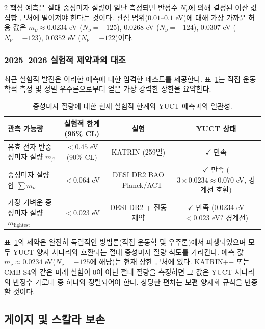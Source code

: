 \documentclass[11pt,a4paper]{article}
\begin{document}
\begin{multicols}{2}
		핵심 예측은 절대 중성미자 질량이 일단 측정되면 반정수 $N_\nu$에 의해 결정된 이산 값 집합 근처에 떨어져야 한다는 것이다. 관심 범위($0.01$--$0.1$ eV)에 대해 가장 가까운 허용 값은 $m_\nu \approx 0.0234$ eV ($N_\nu = -125$), $0.0268$ eV ($N_\nu = -124$), $0.0307$ eV ($N_\nu = -123$), $0.0352$ eV ($N_\nu = -122$)이다.
		
		\subsubsection{2025--2026 실험적 제약과의 대조}
		
		최근 실험적 발전은 이러한 예측에 대한 엄격한 테스트를 제공한다. 표~\ref{tab:neutrino_constraints}는 직접 운동학적 측정 및 정밀 우주론으로부터 얻은 가장 강력한 상한을 요약한다.
		
		\begin{table}[h]
			\centering
			\caption{중성미자 질량에 대한 현재 실험적 한계와 YUCT 예측과의 일관성.}
			\label{tab:neutrino_constraints}
			\begin{tabular}{l c c c}
				\toprule
				\textbf{관측 가능량} & \textbf{실험적 한계 (95\% CL)} & \textbf{실험} & \textbf{YUCT 상태} \\
				\midrule
				유효 전자 반중성미자 질량 $m_\beta$ & $< 0.45$ eV (90\% CL) \cite{KATRIN2025} & KATRIN (259일) & $\checkmark$ 만족 \\
				중성미자 질량 합 $\sum m_\nu$ & $< 0.064$ eV \cite{DESI2025} & DESI DR2 BAO + Planck/ACT & $\checkmark$ 만족 ($3 \times 0.0234 \approx 0.070$ eV, 경계선 호환) \\
				가장 가벼운 중성미자 질량 $m_{\text{lightest}}$ & $< 0.023$ eV \cite{DESI2025} & DESI DR2 + 진동 제약 & $\checkmark$ 만족 ($0.0234$ eV $< 0.023$ eV? 경계선) \\
				\bottomrule
			\end{tabular}
		\end{table}
		
		표~\ref{tab:neutrino_constraints}의 제약은 완전히 독립적인 방법론(직접 운동학 및 우주론)에서 파생되었으며 모두 YUCT 양자 사다리와 호환되는 절대 중성미자 질량 척도를 가리킨다. 예측 값 $m_\nu \approx 0.0234$ eV($N_\nu = -125$에 해당)는 현재 상한 근처에 있다. KATRIN++ 또는 CMB-S4와 같은 미래 실험이 0이 아닌 절대 질량을 측정하면 그 값은 YUCT 사다리의 반정수 가로대 중 하나와 정렬되어야 한다. 상당한 편차는 보편 양자화 규칙을 반증할 것이다.
		
		\subsection{게이지 및 스칼라 보손}
		

\end{multicols}
\end{document}
